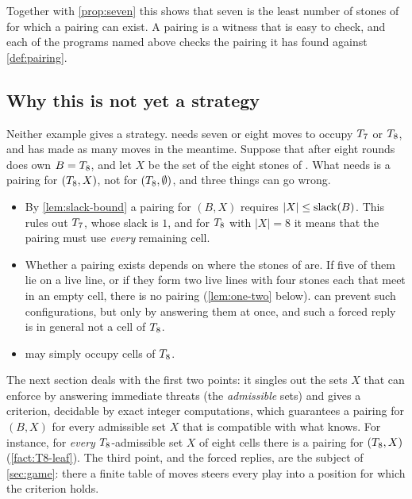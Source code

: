 Together with \cref{prop:seven} this shows that seven is the least number of stones of \Breaker{} for
which a pairing can exist. A pairing is a witness that is easy to check, and each of the programs
named above checks the pairing it has found against \cref{def:pairing}.

\subsection{Why this is not yet a strategy}\label{ssec:not-yet}

Neither example gives \Breaker{} a strategy. \Breaker{} needs seven or eight moves to occupy $T_7$ or
$T_8$, and \Maker{} has made as many moves in the meantime. Suppose that after eight rounds
\Breaker{} does own $B=T_8$, and let $X$ be the set of the eight stones of \Maker. What \Breaker{}
needs is a pairing for $(T_8,X)$, not for $(T_8,\emptyset)$, and three things can go wrong.
\begin{itemize}
\item By \cref{lem:slack-bound} a pairing for $(B,X)$ requires $|X|\le\operatorname{slack}(B)$. This rules out
      $T_7$, whose slack is $1$, and for $T_8$ with $|X|=8$ it means that the pairing must use
      \emph{every} remaining cell.
\item Whether a pairing exists depends on where the stones of \Maker{} are. If five of them lie on a live
      line, or if they form two live lines with four stones each that meet in an empty cell, there is no
      pairing (\cref{lem:one-two} below). \Breaker{} can prevent such configurations, but only by
      answering them at once, and such a forced reply is in general not a cell of $T_8$.
\item \Maker{} may simply occupy cells of $T_8$.
\end{itemize}
The next section deals with the first two points: it singles out the sets $X$ that \Breaker{} can
enforce by answering immediate threats (the \emph{admissible} sets) and gives a criterion, decidable by
exact integer computations, which guarantees a pairing for $(B,X)$ for every admissible set $X$ that is
compatible with what \Breaker{} knows. For instance, for \emph{every} $T_8$-admissible set $X$ of
eight cells there is a pairing for $(T_8,X)$ (\cref{fact:T8-leaf}). The third point,
and the forced replies, are the subject of \cref{sec:game}: there a finite table of moves steers every
play into a position for which the criterion holds.
